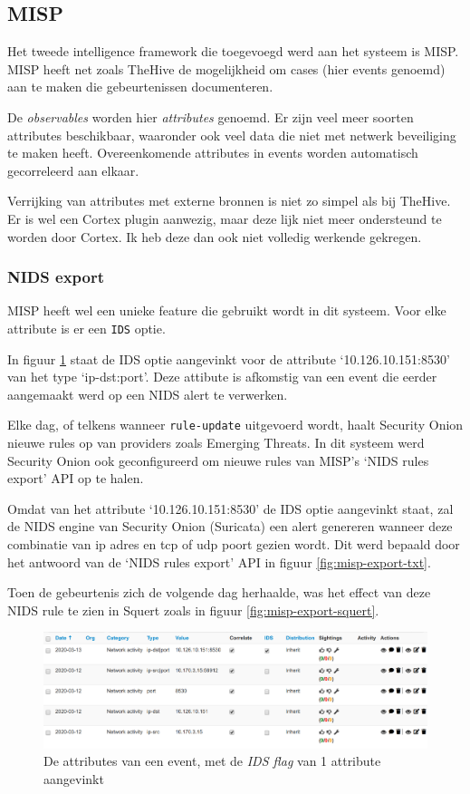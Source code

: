 \documentclass[a4paper,12pt]{report}
\begin{document}
\subsection{MISP}
Het tweede intelligence framework die toegevoegd werd aan het systeem is MISP.
MISP heeft net zoals TheHive de mogelijkheid om cases (hier events genoemd) aan te maken die gebeurtenissen documenteren.

De \emph{observables} worden hier \emph{attributes} genoemd.
Er zijn veel meer soorten attributes beschikbaar, waaronder ook veel data die niet met netwerk beveiliging te maken heeft.
Overeenkomende attributes in events worden automatisch gecorreleerd aan elkaar.

Verrijking van attributes met externe bronnen is niet zo simpel als bij TheHive.
Er is wel een Cortex plugin aanwezig, maar deze lijk niet meer ondersteund te worden door Cortex.
Ik heb deze dan ook niet volledig werkende gekregen.

\subsubsection{NIDS export}
\label{sec:misp-nids-export}
MISP heeft wel een unieke feature die gebruikt wordt in dit systeem.
Voor elke attribute is er een \lstinline|IDS| optie.

In figuur \ref{fig:misp-export-flag} staat de IDS optie aangevinkt voor de attribute `10.126.10.151:8530' van het type `ip-dst:port'.
Deze attibute is afkomstig van een event die eerder aangemaakt werd op een NIDS alert te verwerken.

Elke dag, of telkens wanneer \lstinline|rule-update| uitgevoerd wordt, haalt Security Onion nieuwe rules op van providers zoals Emerging Threats.
In dit systeem werd Security Onion ook geconfigureerd om nieuwe rules van MISP's `NIDS rules export' API op te halen.

Omdat van het attribute `10.126.10.151:8530' de IDS optie aangevinkt staat, zal de NIDS engine van Security Onion (Suricata) een alert genereren wanneer deze combinatie van ip adres en tcp of udp poort gezien wordt.
Dit werd bepaald door het antwoord van de `NIDS rules export' API in figuur \ref{fig:misp-export-txt}.

Toen de gebeurtenis zich de volgende dag herhaalde, was het effect van deze NIDS rule te zien in Squert zoals in figuur \ref{fig:misp-export-squert}.

\begin{figure}[H]
  \centering
  \includegraphics[width=\textwidth]{misp-export-flag}
  \caption{De attributes van een event, met de \emph{IDS flag} van 1 attribute aangevinkt}
  \label{fig:misp-export-flag}
\end{figure}
\end{document}
